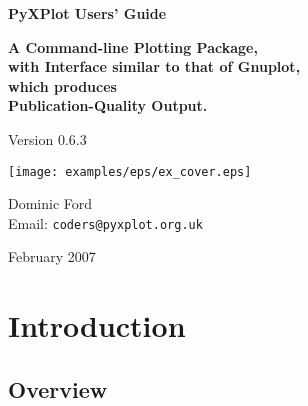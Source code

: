 \documentclass[a4paper,onecolumn,11pt]{book}
\def\version{0.6.3}
\def\reldate{February 2007}
\begin{document}
\begin{titlepage}
\normalsize
\vspace*{0.5cm}
\begin{center}
{\Huge \bf PyXPlot Users' Guide}\\
\end{center}
\vspace*{0.5cm}
\begin{center}
{\LARGE \bf A Command-line Plotting Package, \\ \vspace{2mm} with Interface similar to that of Gnuplot, \\ \vspace{2mm} which produces \\ \vspace{2mm} Publication-Quality Output. \\}
\end{center}
\vspace*{0.5cm}
\begin{center}
{\Large Version \version \\}
\end{center}
\vspace*{0.0cm}
\begin{center}
\texttt{[image: examples/eps/ex\_cover.eps]}
\end{center}
\vspace*{0.0cm}
\begin{center}
{\Large Dominic Ford \\ \vspace{2mm} Email: \noindent \texttt{coders@pyxplot.org.uk} \\ }
\end{center}
\vspace*{0.5cm}
\begin{center}
{\Large \reldate \\}
\end{center}
\end{titlepage}


\tableofcontents

\chapter{Introduction}

\label{introduction}

\section{Overview}
\end{document}
